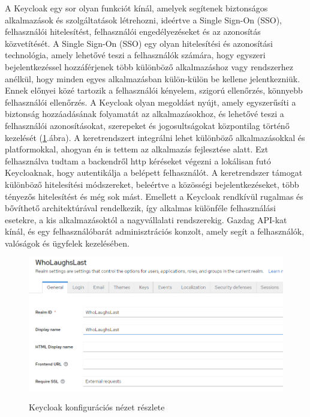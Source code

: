 \documentclass[a4paper,twoside]{article}
\begin{document}
A Keycloak egy sor olyan funkciót kínál, amelyek segítenek biztonságos alkalmazások és szolgáltatások létrehozni, ideértve a Single Sign-On (SSO), felhasználói hitelesítést, felhasználói engedélyezéseket és az azonosítás közvetítését. A Single Sign-On (SSO) egy olyan hitelesítési és azonosítási technológia, amely lehetővé teszi a felhasználók számára, hogy egyszeri bejelentkezéssel hozzáférjenek több különböző alkalmazáshoz vagy rendszerhez anélkül, hogy minden egyes alkalmazásban külön-külön be kellene jelentkezniük. Ennek előnyei közé tartozik a felhasználói kényelem, szigorú ellenőrzés, könnyebb felhasználói ellenőrzés. A Keycloak olyan megoldást nyújt, amely egyszerűsíti a biztonság hozzáadásának folyamatát az alkalmazásokhoz, és lehetővé teszi a felhasználói azonosításokat, szerepeket és jogosultságokat központilag történő kezelését (\ref{keycloak-login}.ábra). A keretrendszert integrálni lehet különböző alkalmazásokkal és platformokkal, ahogyan én is tettem az alkalmazás fejlesztése alatt. Ezt felhasználva tudtam a backendről http kéréseket végezni a lokálisan futó Keycloaknak, hogy autentikálja a belépett felhasználót. A keretrendszer támogat különböző hitelesítési módszereket, beleértve a közösségi bejelentkezéseket, több tényezős hitelesítést és még sok mást. Emellett a Keycloak rendkívül rugalmas és bővíthető architektúrával rendelkezik, így alkalmas különféle felhasználási esetekre, a kis alkalmazásoktól a nagyvállalati rendszerekig. Gazdag API-kat kínál, és egy felhasználóbarát adminisztrációs konzolt, amely segít a felhasználók, valóságok és ügyfelek kezelésében.

\begin{figure}
	\caption{Keycloak konfigurációs nézet részlete}
	\includegraphics[scale=0.5]{keycloak-login}
	\label{keycloak-login}
\end{figure}
\end{document}
